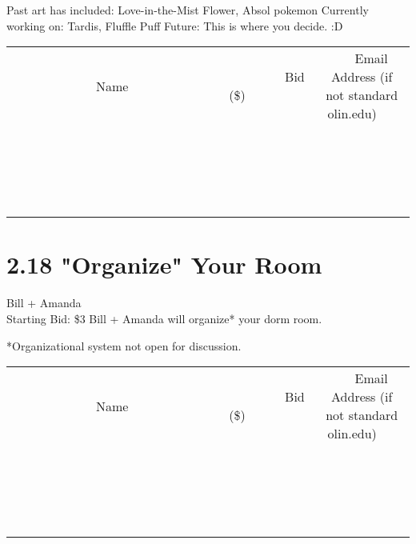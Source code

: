 \documentclass[11pt]{article}
\begin{document}
Past art has included: Love-in-the-Mist Flower, Absol pokemon
Currently working on: Tardis, Fluffle Puff
Future: This is where you decide. :D
\\[3ex]
\begin{tabular}{c c c}
~~~~~~~~~~~~~Name~~~~~~~~~~~~~ & ~~~~~~~~~Bid (\$)~~~~~~~~~  & ~~~Email Address (if not standard olin.edu)~~~\\
 & & \\
\hline
 & & \\
\hline
 & & \\
\hline
 & & \\
\hline
 & & \\
\hline
 & & \\
\hline
 & & \\
\hline
 & & \\
\hline
 & & \\
\hline
 & & \\
\hline
 & & \\
\hline
 & & \\
\hline
 & & \\
\hline
 & & \\
\hline
 & & \\
\hline
 & & \\
\hline
 & & \\
\hline
 & & \\
\hline
 & & \\
\hline
\end{tabular}
\newpage
\section*{2.18 "Organize" Your Room}
Bill + Amanda
\\
Starting Bid: \$3
\newline
Bill + Amanda will organize* your dorm room. 

*Organizational system not open for discussion.
\\[3ex]
\begin{tabular}{c c c}
~~~~~~~~~~~~~Name~~~~~~~~~~~~~ & ~~~~~~~~~Bid (\$)~~~~~~~~~  & ~~~Email Address (if not standard olin.edu)~~~\\
 & & \\
\hline
 & & \\
\hline
 & & \\
\hline
 & & \\
\hline
 & & \\
\hline
 & & \\
\hline
 & & \\
\hline
 & & \\
\hline
 & & \\
\hline
 & & \\
\hline
 & & \\
\hline
 & & \\
\hline
 & & \\
\hline
 & & \\
\hline
 & & \\
\hline
 & & \\
\hline
 & & \\
\hline
 & & \\
\hline
 & & \\
\hline
\end{tabular}
\newpage
\end{document}
